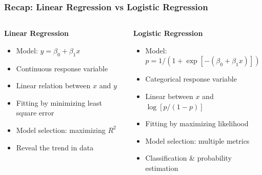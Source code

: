 \documentclass[10pt,aspectratio=169]{beamer}
\begin{document}
      \begin{frame}
        \frametitle{Recap: Linear Regression vs Logistic Regression}
        \begin{columns}[T]
          \begin{column}{0.5\textwidth}
            \begin{minipage}[t][\textwidth][t]{1.0\linewidth}
              \textbf{Linear Regression}
              \begin{itemize}
                \vfill \item Model: $y = \beta_{0} + \beta_{1}x$
              
                \vfill \item Continuous response variable

              
                \vfill \item Linear relation between $x$ and $y$
              
                \vfill \item Fitting by minimizing least square error
              
                \vfill \item Model selection: maximizing $R^{2}$

              
                \vfill \item Reveal the trend in data
              \end{itemize}
            \end{minipage}
          \end{column}

          \begin{column}{0.5\textwidth}
            \begin{minipage}[t][\textwidth][t]{1.0\linewidth}
              \textbf{Logistic Regression}

              \begin{itemize}
                \vfill \item Model:
                $p =1 / (1 + \exp[-(\beta_{0} + \beta_{1}x)])$

                \vfill \item Categorical response variable

                \vfill \item Linear between $x$ and $\log[p/(1-p)]$

                \vfill \item Fitting by maximizing likelihood

              
                \vfill \item Model selection: multiple metrics

              
                \vfill \item Classification \& probability estimation
              
              \end{itemize}
            \end{minipage}
          \end{column}
        \end{columns}
      \end{frame}
\end{document}
